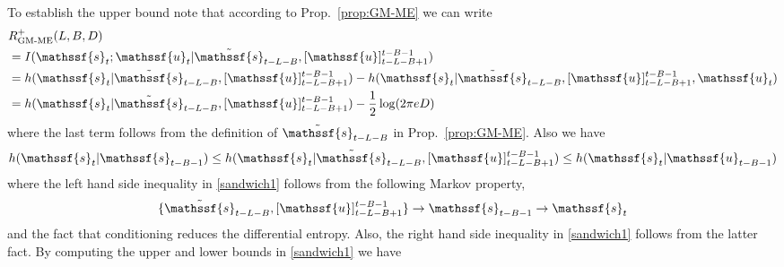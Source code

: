 \documentclass[journal, twocolumn, 10pt]{IEEEtran}
\newcommand{\rvs}{{\mathssf{s}}}    %
\newcommand{\rvu}{{\mathssf{u}}}    %
\begin{document}
{To establish the upper bound note that
according to Prop.~\ref{prop:GM-ME} we can write 
\begin{align}
&R^{+}_{\textrm{GM-ME}}(L,B,D) \notag\\
&= I(\rvs_t ;\rvu_t | \tilde{\rvs}_{t-L-B}, [\rvu]_{t-L-B+1}^{t-B-1})\notag\\
&= h(\rvs_t | \tilde{\rvs}_{t-L-B}, [\rvu]_{t-L-B+1}^{t-B-1}) - h(\rvs_t | \tilde{\rvs}_{t-L-B}, [\rvu]_{t-L-B+1}^{t-B-1}, \rvu_t)\notag\\
&= h(\rvs_t | \tilde{\rvs}_{t-L-B}, [\rvu]_{t-L-B+1}^{t-B-1}) - \frac{1}{2} \log (2 \pi e D) \label{eq:limcal}
\end{align} 
where the last term follows from the definition of $\tilde{\rvs}_{t-L-B}$ in Prop.~\ref{prop:GM-ME}. Also we have 
\begin{align}
h(\rvs_{t}|\rvs_{t-B-1}) \le  h(\rvs_t | \tilde{\rvs}_{t-L-B}, [\rvu]_{t-L-B+1}^{t-B-1})  \le h(\rvs_t | \rvu_{t-B-1}) \label{sandwich1}
\end{align} where the left hand side inequality in \eqref{sandwich1} follows from the following Markov property,
\begin{align}
 \{ \tilde{\rvs}_{t-L-B}, [\rvu]_{t-L-B+1}^{t-B-1}\}  \rightarrow \rvs_{t-B-1} \rightarrow \rvs_{t}
\end{align} and the fact that conditioning reduces the differential entropy. Also, the right hand side inequality in \eqref{sandwich1} follows from the latter fact. By computing the upper and lower bounds in \eqref{sandwich1} we have 
}
\end{document}
